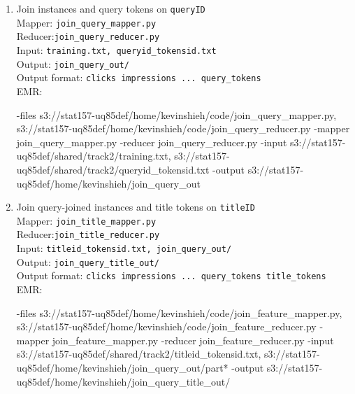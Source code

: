 \documentclass[11pt]{article}
\begin{document}
\begin{enumerate}
\item
Join instances and query tokens on \texttt{queryID} \\
Mapper: \texttt{join\_query\_mapper.py} \\
Reducer:\texttt{join\_query\_reducer.py} \\
Input: \texttt{training.txt, queryid\_tokensid.txt} \\
Output: \texttt{join\_query\_out/} \\
Output format: \texttt{clicks impressions ... query\_tokens} \\
EMR: \begin{spverbatim}
-files s3://stat157-uq85def/home/kevinshieh/code/join_query_mapper.py,
s3://stat157-uq85def/home/kevinshieh/code/join_query_reducer.py 
-mapper join_query_mapper.py -reducer join_query_reducer.py 
-input s3://stat157-uq85def/shared/track2/training.txt,
s3://stat157-uq85def/shared/track2/queryid_tokensid.txt 
-output s3://stat157-uq85def/home/kevinshieh/join_query_out
\end{spverbatim}

\item
Join query-joined instances and title tokens on \texttt{titleID} \\
Mapper: \texttt{join\_title\_mapper.py} \\
Reducer:\texttt{join\_title\_reducer.py} \\
Input: \texttt{titleid\_tokensid.txt, join\_query\_out/} \\
Output: \texttt{join\_query\_title\_out/} \\
Output format: \texttt{clicks impressions ... query\_tokens title\_tokens} \\
EMR: \begin{spverbatim}
-files s3://stat157-uq85def/home/kevinshieh/code/join_feature_mapper.py,
s3://stat157-uq85def/home/kevinshieh/code/join_feature_reducer.py 
-mapper join_feature_mapper.py -reducer join_feature_reducer.py 
-input s3://stat157-uq85def/shared/track2/titleid_tokensid.txt,
s3://stat157-uq85def/home/kevinshieh/join_query_out/part* 
-output s3://stat157-uq85def/home/kevinshieh/join_query_title_out/
\end{spverbatim}


\end{enumerate}
\end{document}
